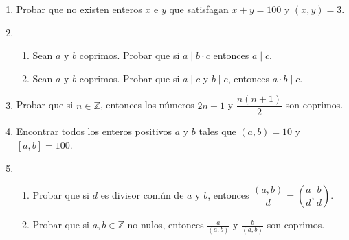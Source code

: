 \documentclass[a4paper,12pt,twoside,spanish,reqno]{amsbook}
\numberwithin{equation}{section}
\begin{document}
\begin{enumerate}




\item Probar que no existen enteros $x$ e $y$ que satisfagan $x+y=100$ y $(x,y)=3$.


\item %
\begin{enumerate}
 \item Sean $a$ y $b$ coprimos. Probar que si $a\mid b\cdot c$ entonces $a \mid c$.
 \item Sean $a$ y $b$ coprimos. Probar que si $a \mid c$ y $b \mid c$, entonces $a\cdot b \mid c$.

\end{enumerate}




\item Probar que si $n \in {\mathbb Z}$, entonces los números $2n+1$ y $\dfrac{n(n+1)}{2}$ son coprimos.




\item Encontrar todos los enteros positivos $a$ y $b$ tales que $(a,b)=10$ y $[a,b]=100$.


\item
\begin{enumerate}
\item Probar que si $d$ es divisor común de $a$ y $b$, entonces $\dfrac{(a,b)}{d} = \left(\dfrac{a}{d}, \dfrac{b}{d}\right)$.
\item Probar que si $a,b\in \mathbb Z$ no nulos, entonces  $\displaystyle \frac a{(a,b)}$ y $\displaystyle \frac b{(a,b)}$ son coprimos.
\end{enumerate}



\end{enumerate}
\end{document}
